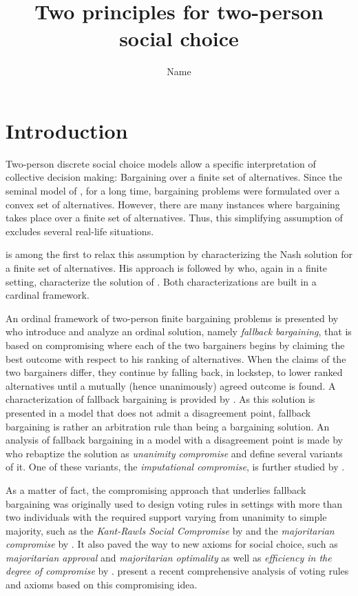 \documentclass[version=3.21, pagesize, twoside=off, bibliography=totoc, DIV=calc, fontsize=12pt, a4paper]{scrartcl}
\title{Two principles for two-person social choice}
\author{Name}
\affil{Université Paris-Dauphine, PSL Research University, CNRS, LAMSADE, 75016 PARIS, FRANCE\\
}
\begin{document}
\maketitle

\section{Introduction}
\label{sec:intro}
Two-person discrete social choice models allow a specific interpretation of collective decision making: Bargaining over a finite set of alternatives. Since the seminal model of \cite{Nash1950}, for a long time, bargaining problems were formulated over a convex set of alternatives. However, there are many instances where bargaining takes place over a finite set of alternatives. Thus, this simplifying assumption of \cite{Nash1950} excludes several real-life situations. 

\cite{Mariotti1998} is among the first to relax this assumption by characterizing the Nash solution for a finite set of alternatives. His approach is followed by \cite{nagahisa2002axiomatization} who, again in a finite setting, characterize the solution of \cite{kalai1975other}. Both characterizations are built in a cardinal framework. 
 
An ordinal framework of two-person finite bargaining problems is presented by \cite{BramsKilgour2001} who introduce and analyze an ordinal solution, namely \textit{fallback bargaining}, that is based on compromising where each of the two bargainers begins by claiming the best outcome with respect to his ranking of alternatives. When the claims of the two bargainers differ, they continue by falling back, in lockstep, to lower ranked alternatives until a mutually (hence unanimously) agreed outcome is found. A characterization of fallback bargaining is provided by \cite{de2012reason}. As this solution is presented in a model that does not admit a disagreement point, fallback bargaining is rather an arbitration rule than being a bargaining solution. An analysis of fallback bargaining in a model with a disagreement point is made by \cite{KibrisSertel2007} who rebaptize the solution as \textit{unanimity compromise} and define several variants of it. One of these variants, the \textit{imputational compromise}, is further studied by \cite{ConleyWilkie2012}.
 
As a matter of fact, the compromising approach that underlies fallback bargaining was originally used to design voting rules in settings with more than two individuals with the required support varying from unanimity to simple majority, such as the \textit{Kant-Rawls Social Compromise} by \cite{HurwiczSertel1997}  and the \textit{majoritarian compromise} by \cite{sertel1999majoritarian}. It also paved the way to new axioms for social choice, such as \textit{majoritarian approval} and \textit{majoritarian optimality} as well as \textit{efficiency in the degree of compromise} by \cite{ozkal2004efficiency}.
\cite{merlin2019compromise} present a recent comprehensive analysis of voting rules and axioms based on this compromising idea.
\end{document}

